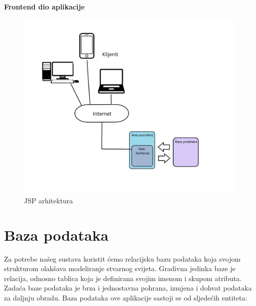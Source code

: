 		\pagebreak
		
		\textbf{Frontend dio aplikacije}
		
		\medskip
		
		
		\normalfont{}
	
		\begin{figure}[h]
			\centering
			\includegraphics[width=\linewidth]{slike/jsp_arh.png}
			\caption{JSP arhitektura}
			\label{fig:arh3}
		\end{figure}	
		
		\pagebreak
				
		\section{Baza podataka}
	
	Za potrebe našeg sustava koristit ćemo relacijsku bazu podataka koja svojom strukturom olakšava modeliranje stvarnog svijeta. Gradivna jedinka baze je relacija, odnosno tablica koja je definirana svojim imenom i skupom atributa. Zadaća baze podataka je brza i jednostavna pohrana, izmjena i dohvat podataka za daljnju obradu.
	Baza podataka ove aplikacije sastoji se od sljedećih entiteta: 
	
